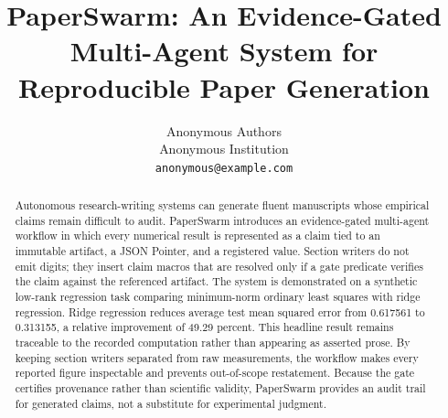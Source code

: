 \documentclass{article}
\title{PaperSwarm: An Evidence-Gated Multi-Agent System for Reproducible Paper Generation}
\author{Anonymous Authors \\
Anonymous Institution \\
\texttt{anonymous@example.com}}
\begin{document}
\maketitle

\begin{abstract}
Autonomous research-writing systems can generate fluent manuscripts whose empirical claims remain difficult to audit. PaperSwarm introduces an evidence-gated multi-agent workflow in which every numerical result is represented as a claim tied to an immutable artifact, a JSON Pointer, and a registered value. Section writers do not emit digits; they insert claim macros that are resolved only if a gate predicate verifies the claim against the referenced artifact. The system is demonstrated on a synthetic low-rank regression task comparing minimum-norm ordinary least squares with ridge regression. Ridge regression reduces average test mean squared error from 0.617561 to 0.313155, a relative improvement of 49.29 percent. This headline result remains traceable to the recorded computation rather than appearing as asserted prose. By keeping section writers separated from raw measurements, the workflow makes every reported figure inspectable and prevents out-of-scope restatement. Because the gate certifies provenance rather than scientific validity, PaperSwarm provides an audit trail for generated claims, not a substitute for experimental judgment.
\end{abstract}










\end{document}
